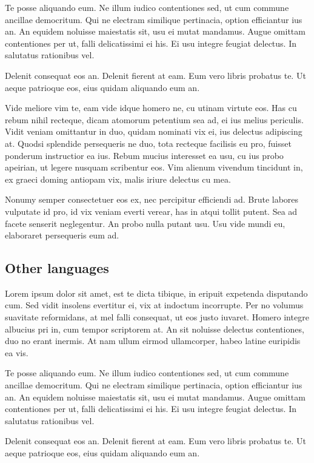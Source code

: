 \documentclass[10pt, letterpapper]{proc}
\begin{document}
Te posse aliquando eum. Ne illum iudico contentiones sed, ut cum commune ancillae democritum. Qui ne electram similique pertinacia, option efficiantur ius an. An equidem noluisse maiestatis sit, usu ei mutat mandamus. Augue omittam contentiones per ut, falli delicatissimi ei his. Ei usu integre feugiat delectus. In salutatus rationibus vel.

Delenit consequat eos an. Delenit fierent at eam. Eum vero libris probatus te. Ut aeque patrioque eos, eius quidam aliquando eum an.

Vide meliore vim te, eam vide idque homero ne, cu utinam virtute eos. Has cu rebum nihil recteque, dicam atomorum petentium sea ad, ei ius melius periculis. Vidit veniam omittantur in duo, quidam nominati vix ei, ius delectus adipiscing at. Quodsi splendide persequeris ne duo, tota recteque facilisis eu pro, fuisset ponderum instructior ea ius. Rebum mucius interesset ea usu, cu ius probo apeirian, ut legere nusquam scribentur eos. Vim alienum vivendum tincidunt in, ex graeci doming antiopam vix, malis iriure delectus cu mea.

Nonumy semper consectetuer eos ex, nec percipitur efficiendi ad. Brute labores vulputate id pro, id vix veniam everti verear, has in atqui tollit putent. Sea ad facete senserit neglegentur. An probo nulla putant usu. Usu vide mundi eu, elaboraret persequeris eum ad.

\subsection{Other languages}
Lorem ipsum dolor sit amet, est te dicta tibique, in eripuit expetenda disputando cum. Sed vidit insolens evertitur ei, vix at indoctum incorrupte. Per no volumus suavitate reformidans, at mel falli consequat, ut eos justo iuvaret. Homero integre albucius pri in, cum tempor scriptorem at. An sit noluisse delectus contentiones, duo no erant inermis. At nam ullum eirmod ullamcorper, habeo latine euripidis ea vis.

Te posse aliquando eum. Ne illum iudico contentiones sed, ut cum commune ancillae democritum. Qui ne electram similique pertinacia, option efficiantur ius an. An equidem noluisse maiestatis sit, usu ei mutat mandamus. Augue omittam contentiones per ut, falli delicatissimi ei his. Ei usu integre feugiat delectus. In salutatus rationibus vel.

Delenit consequat eos an. Delenit fierent at eam. Eum vero libris probatus te. Ut aeque patrioque eos, eius quidam aliquando eum an.
\end{document}
